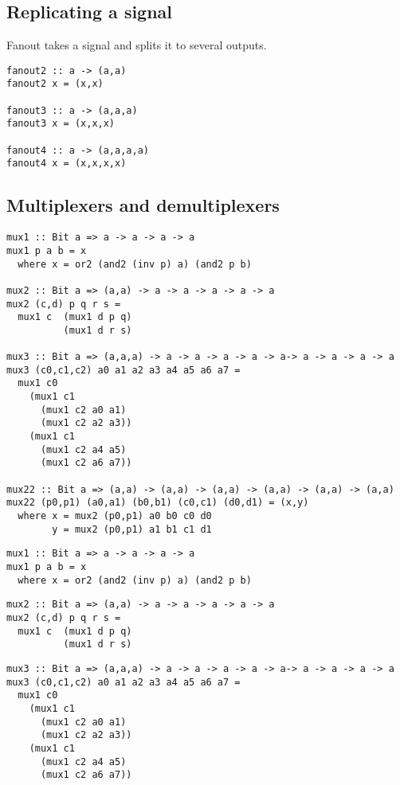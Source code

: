 \documentclass[11pt]{article}
\begin{document}
\subsection{Replicating a signal}
\label{sec:orgb66b932}

Fanout takes a signal and splits it to several outputs.

\begin{verbatim}
fanout2 :: a -> (a,a)
fanout2 x = (x,x)

fanout3 :: a -> (a,a,a)
fanout3 x = (x,x,x)

fanout4 :: a -> (a,a,a,a)
fanout4 x = (x,x,x,x)
\end{verbatim}

\subsection{Multiplexers and demultiplexers}
\label{sec:orgddc3d43}

\begin{verbatim}
mux1 :: Bit a => a -> a -> a -> a
mux1 p a b = x
  where x = or2 (and2 (inv p) a) (and2 p b)

mux2 :: Bit a => (a,a) -> a -> a -> a -> a -> a
mux2 (c,d) p q r s =
  mux1 c  (mux1 d p q)
          (mux1 d r s)

mux3 :: Bit a => (a,a,a) -> a -> a -> a -> a -> a-> a -> a -> a -> a
mux3 (c0,c1,c2) a0 a1 a2 a3 a4 a5 a6 a7 =
  mux1 c0
    (mux1 c1
      (mux1 c2 a0 a1)
      (mux1 c2 a2 a3))
    (mux1 c1
      (mux1 c2 a4 a5)
      (mux1 c2 a6 a7))

mux22 :: Bit a => (a,a) -> (a,a) -> (a,a) -> (a,a) -> (a,a) -> (a,a)
mux22 (p0,p1) (a0,a1) (b0,b1) (c0,c1) (d0,d1) = (x,y)
  where x = mux2 (p0,p1) a0 b0 c0 d0
        y = mux2 (p0,p1) a1 b1 c1 d1
\end{verbatim}


\begin{verbatim}
mux1 :: Bit a => a -> a -> a -> a
mux1 p a b = x
  where x = or2 (and2 (inv p) a) (and2 p b)
\end{verbatim}


\begin{verbatim}
mux2 :: Bit a => (a,a) -> a -> a -> a -> a -> a
mux2 (c,d) p q r s =
  mux1 c  (mux1 d p q)
          (mux1 d r s)
\end{verbatim}



\begin{verbatim}
mux3 :: Bit a => (a,a,a) -> a -> a -> a -> a -> a-> a -> a -> a -> a
mux3 (c0,c1,c2) a0 a1 a2 a3 a4 a5 a6 a7 =
  mux1 c0
    (mux1 c1
      (mux1 c2 a0 a1)
      (mux1 c2 a2 a3))
    (mux1 c1
      (mux1 c2 a4 a5)
      (mux1 c2 a6 a7))
\end{verbatim}
\end{document}
